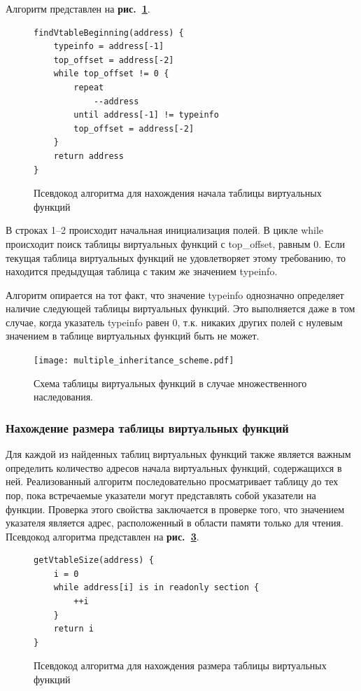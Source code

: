 \documentclass[a4paper,12pt,russian]{article}
\newcommand{\picref}[1]{\textbf{рис.~\ref{#1}}}
\newcommand{\code}[1]{\textsf{#1}}
\begin{document}
Алгоритм представлен на \picref{find_vtable_begin_lst}.
\begin{figure}
\begin{lstlisting}
findVtableBeginning(address) {
    typeinfo = address[-1]
    top_offset = address[-2]
    while top_offset != 0 {
        repeat
            --address
        until address[-1] != typeinfo
        top_offset = address[-2]
    }
    return address
}
\end{lstlisting}
\caption{Псевдокод алгоритма для нахождения начала таблицы виртуальных функций}
\label{find_vtable_begin_lst}
\end{figure}

В строках 1--2 происходит начальная инициализация полей.
В цикле \code{while} происходит поиск таблицы виртуальных функций с \code{top\_offset}, равным 0.
Если текущая таблица виртуальных функций не удовлетворяет этому требованию, то находится предыдущая таблица с таким же значением \code{typeinfo}.

Алгоритм опирается на тот факт, что значение \code{typeinfo} однозначно определяет наличие следующей таблицы виртуальных функций.
Это выполняется даже в том случае, когда указатель \code{typeinfo} равен 0, т.к. никаких других полей с нулевым значением в таблице виртуальных функций быть не может.

\begin{figure}
  \center
  \texttt{[image: multiple\_inheritance\_scheme.pdf]}
  \hfill
  \caption{Схема таблицы виртуальных функций в случае множественного наследования.}
  \label{multiple_inheritance_scheme_fig}
\end{figure}

\subsubsection{Нахождение размера таблицы виртуальных функций}
Для каждой из найденных таблиц виртуальных функций также является важным определить количество адресов начала виртуальных функций, содержащихся в ней.
Реализованный алгоритм последовательно просматривает таблицу до тех пор, пока встречаемые указатели могут представлять собой указатели на функции.
Проверка этого свойства заключается в проверке того, что значением указателя является адрес, расположенный в области памяти только для чтения.
Псевдокод алгоритма представлен на \picref{find_vtable_size_lst}.
\begin{figure}
\begin{lstlisting}
getVtableSize(address) {
    i = 0
    while address[i] is in readonly section {
        ++i
    }
    return i
}
\end{lstlisting}
\caption{Псевдокод алгоритма для нахождения размера таблицы виртуальных функций}
\label{find_vtable_size_lst}
\end{figure}
\end{document}
